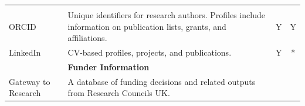 \documentclass[]{krantz}
\begin{document}
\begin{longtable}[]{@{}llcc@{}}
\begin{minipage}[t]{0.02\columnwidth}
\strut
\end{minipage}\tabularnewline
\begin{minipage}[t]{0.10\columnwidth}\raggedright\strut
ORCID\strut
\end{minipage} & \begin{minipage}[t]{0.74\columnwidth}\raggedright\strut
Unique identifiers for research authors. Profiles include information on
publication lists, grants, and affiliations.\strut
\end{minipage} & \begin{minipage}[t]{0.02\columnwidth}\centering\strut
Y\strut
\end{minipage} & \begin{minipage}[t]{0.02\columnwidth}\centering\strut
Y\strut
\end{minipage}\tabularnewline
\begin{minipage}[t]{0.10\columnwidth}\raggedright\strut
LinkedIn\strut
\end{minipage} & \begin{minipage}[t]{0.74\columnwidth}\raggedright\strut
CV-based profiles, projects, and publications.\strut
\end{minipage} & \begin{minipage}[t]{0.02\columnwidth}\centering\strut
Y\strut
\end{minipage} & \begin{minipage}[t]{0.02\columnwidth}\centering\strut
*\strut
\end{minipage}\tabularnewline
\begin{minipage}[t]{0.10\columnwidth}\raggedright\strut
\strut
\end{minipage} & \begin{minipage}[t]{0.74\columnwidth}\raggedright\strut
\textbf{Funder Information}\strut
\end{minipage} & \begin{minipage}[t]{0.02\columnwidth}\centering\strut
\strut
\end{minipage} & \begin{minipage}[t]{0.02\columnwidth}\centering\strut
\strut
\end{minipage}\tabularnewline
\begin{minipage}[t]{0.10\columnwidth}\raggedright\strut
Gateway to Research\strut
\end{minipage} & \begin{minipage}[t]{0.74\columnwidth}\raggedright\strut
A database of funding decisions and related outputs from Research
Councils UK.\strut
\end{minipage} & \begin{minipage}[t]{0.02\columnwidth}\centering\strut

\end{minipage}
\end{longtable}
\end{document}
